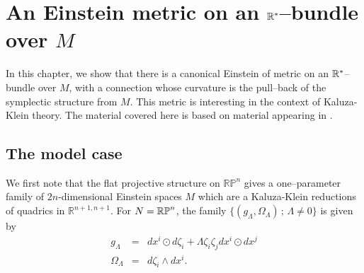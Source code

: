 
\chapter{An Einstein metric on an $\mathbb{R}^*$--bundle over $M$}
\label{chap:KK_lift}
In this chapter, we show that there is a canonical Einstein of metric on an $\mathbb{R}^*$--bundle over $M$, with a connection whose curvature is the pull--back
of the symplectic structure from $M$. This metric is interesting in the context of Kaluza-Klein theory. The material covered here is based on material appearing in \cite{DW}.


\section{The model case} \label{sec:quadric}

We first note that the flat projective structure on $\mathbb{RP}^{n}$ gives a one--parameter family of $2n$-dimensional Einstein spaces $M$ which are a Kaluza-Klein reductions of quadrics in $\mathbb{R}^{n+1,n+1}$. For $N=\mathbb{RP}^n$, the family $\{(g_\Lambda,\Omega_\Lambda)\,;\,\Lambda\neq 0\}$ is given by
\begin{eqnarray}
g_{\Lambda} & = &  dx^{i} \odot d\zeta_{i}+\Lambda\zeta_{i}\zeta_j dx^{i}\odot dx^j \label{eq:g_LambdaModel}\\
\Omega_{\Lambda} & = &  d\zeta_{i}\wedge dx^{i}.\nonumber
\end{eqnarray}

